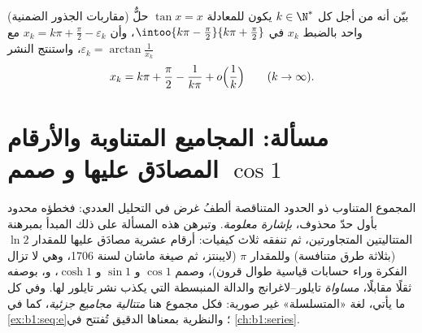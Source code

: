 \begin{exercise}[$\star\star\star$]\label{exo:b1:taylor:12}
(مقاربات الجذور الضمنية) بيّن أنه من أجل كل $k \in
\N^*$ يكون للمعادلة $\tan x = x$ حلٌّ واحد بالضبط $x_k$
في $\intoo{k\pi - \frac\pi2}{k\pi + \frac\pi2}$، وأن $x_k = k\pi
+ \frac\pi2 - \varepsilon_k$ مع $\varepsilon_k =
\arctan\frac{1}{x_k}$، واستنتج النشر
\[
x_k = k\pi + \frac\pi2 - \frac{1}{k\pi} + o\Bigl(\frac
1k\Bigr) \qquad (k \to \infty).
\]
\end{exercise}

\section{مسألة: المجاميع المتناوبة والأرقام المصادَق عليها و
صمم $\cos 1$}

\begin{problem}
\label{pb:b1:taylor:1}
المجموع المتناوب ذو الحدود المتناقصة ألطفُ
غرض في التحليل العددي: فخطؤه محدود بأول
حدّ محذوف، \emph{بإشارة معلومة}. وتبرهن هذه المسألة على ذلك
المبدأ بمبرهنة المتتاليتين المتجاورتين، ثم تنفقه
ثلاث كيفيات: أرقام عشرية مصادَق عليها للمقدار $\ln 2$ (بثلاثة طرق متنافسة)
وللمقدار $\pi$ (لايبنتز، ثم صيغة ماشان لسنة 1706، وهي لا تزال
الفكرة وراء حسابات قياسية طوال قرون)،
وصمم $\cos 1$ و $\sin 1$ و $\cosh 1$، و، بوصفه
ثقلًا مقابلًا، \emph{مساواة} تايلور--لاغرانج والدالة
المنبسطة التي يكذب نشر تايلور لها. وفي كل ما يأتي، لغة
«المتسلسلة» غير صورية: فكل مجموع
هنا \emph{متتالية مجاميع جزئية}، كما في
\cref{ex:b1:seq:e}؛ والنظرية بمعناها الدقيق تُفتتح في
\cref{ch:b1:series}.


\end{problem}
